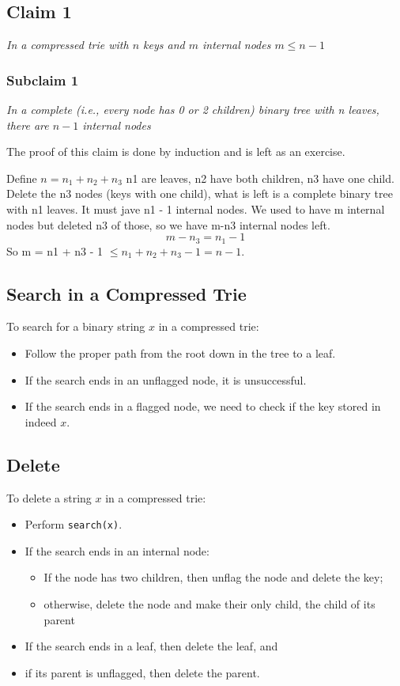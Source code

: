 \documentclass{report}
\begin{document}
\subsection{Claim 1}
\begin{center}
\textit{In a compressed trie with $n$ keys and $m$ internal nodes $m \leq n-1$}
\end{center}
\begin{adjustwidth}{0.5cm}{}
\subsubsection{Subclaim 1}
\begin{center}
\textit{In a complete (i.e., every node has 0 or 2 children) binary tree with n leaves, there are $n-1$ internal nodes}
\end{center}
The proof of this claim is done by induction and is left as an exercise.\\
\end{adjustwidth}
Define $n = n_1 + n_2 + n_3$ n1 are leaves, n2 have both children, n3 have one child.
Delete the n3 nodes (keys with one child), what is left is a complete binary tree with n1 leaves. It must jave n1 - 1 internal nodes.
We used to have m internal nodes but deleted n3 of those, so we have m-n3 internal nodes left. $$m-n_3 = n_1 - 1$$
So m = n1 + n3 - 1 $\leq n_1 + n_2 + n_3 - 1 = n - 1$.
\subsection{Search in a Compressed Trie}
To search for a binary string $x$ in a compressed trie:
\begin{itemize}
\item Follow the proper path from the root down in the tree to a leaf.
\item If the search ends in an unflagged node, it is unsuccessful.
\item If the search ends in a flagged node, we need to check if the key stored in indeed $x$.
\end{itemize}
\subsection{Delete}
To delete a string $x$ in a compressed trie:
\begin{itemize}
\item Perform \texttt{search(x)}.
\item If the search ends in an internal node:
\begin{itemize}
\item If the node has two children, then unflag the node and delete the key;
\item otherwise, delete the node and make their only child, the child of its parent
\end{itemize}
\item If the search ends in a leaf, then delete the leaf, and
\item if its parent is unflagged, then delete the parent.
\end{itemize}
\end{document}
